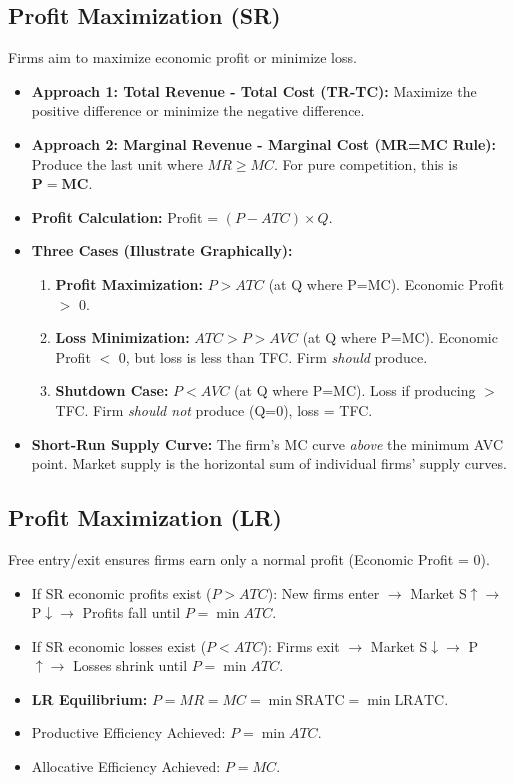 \documentclass{article}
\begin{document}
\subsection*{Profit Maximization (SR)}
Firms aim to maximize economic profit or minimize loss.
\begin{itemize}
    \item \textbf{Approach 1: Total Revenue - Total Cost (TR-TC):} Maximize the positive difference or minimize the negative difference.
    \item \textbf{Approach 2: Marginal Revenue - Marginal Cost (MR=MC Rule):} Produce the last unit where $MR \geq MC$. For pure competition, this is $\mathbf{P=MC}$.
    \item \textbf{Profit Calculation:} Profit = $(P - ATC) \times Q$.
    \item \textbf{Three Cases (Illustrate Graphically):}
        \begin{enumerate}
            \item \textbf{Profit Maximization:} $P > ATC$ (at Q where P=MC). Economic Profit $>$ 0.
            \item \textbf{Loss Minimization:} $ATC > P > AVC$ (at Q where P=MC). Economic Profit $<$ 0, but loss is less than TFC. Firm \textit{should} produce.
            \item \textbf{Shutdown Case:} $P < AVC$ (at Q where P=MC). Loss if producing $>$ TFC. Firm \textit{should not} produce (Q=0), loss = TFC.
        \end{enumerate}
    \item \textbf{Short-Run Supply Curve:} The firm's MC curve \textit{above} the minimum AVC point. Market supply is the horizontal sum of individual firms' supply curves.
\end{itemize}

\subsection*{Profit Maximization (LR)}
Free entry/exit ensures firms earn only a normal profit (Economic Profit = 0).
\begin{itemize}
    \item If SR economic profits exist ($P > ATC$): New firms enter $\rightarrow$ Market S$\uparrow \rightarrow$ P$\downarrow \rightarrow$ Profits fall until $P = \min ATC$.
    \item If SR economic losses exist ($P < ATC$): Firms exit $\rightarrow$ Market S$\downarrow \rightarrow$ P$\uparrow \rightarrow$ Losses shrink until $P = \min ATC$.
    \item \textbf{LR Equilibrium:} $P = MR = MC = \min \text{SRATC} = \min \text{LRATC}$.
    \item Productive Efficiency Achieved: $P = \min ATC$.
    \item Allocative Efficiency Achieved: $P = MC$.
\end{itemize}
\end{document}

